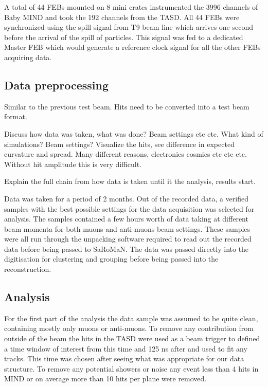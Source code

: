A total of 44 FEBs mounted on 8 mini crates instrumented the 3996 channels of Baby MIND and took the 192 channels from the TASD. All 44 FEBs were synchronized using the spill signal from T9 beam line which arrives one second before the arrival of the spill of particles. This signal was fed to a dedicated Master FEB which would generate a reference clock signal for all the other FEBs acquiring data.

\subsection{Data preprocessing}

Similar to the previous test beam. Hits need to be converted into a test beam format.

Discuss how data was taken, what was done? Beam settings etc etc. What kind of simulations? Beam settings? Visualize the hits, see difference in expected curvature and spread. Many different reasons, electronics cosmics etc etc etc. Without hit amplitude this is very difficult.

Explain the full chain from how data is taken until it the analysis, results start.

Data was taken for a period of 2 months. Out of the recorded data, a verified samples with the best possible settings for the data acquisition was selected for analysis. The samples contained a few hours worth of data taking at different beam momenta for both muons and anti-muons beam settings. These samples were all run through the unpacking software required to read out the recorded data before being passed to SaRoMaN. The data was passed directly into the digitisation for clustering and grouping before being passed into the reconstruction.

\subsection{Analysis}

For the first part of the analysis the data sample was assumed to be quite clean, containing mostly only muons or anti-muons. To remove any contribution from outside of the beam the hits in the TASD were used as a beam trigger to defined a time window of  interest from this time and 125 ns after and used to fit any tracks. This time was chosen after seeing what was appropriate for our data structure. To remove any potential showers or noise any event less than 4 hits in MIND or on average more than 10 hits per plane were removed.

